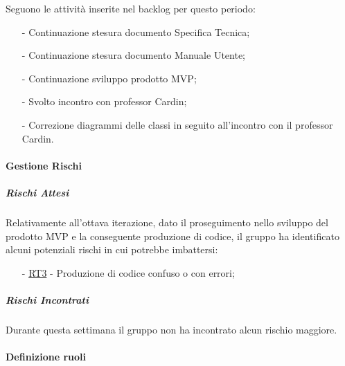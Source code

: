 \documentclass[10pt]{article}
\begin{document}
{{{{{{{{{        Seguono le attività inserite nel backlog per questo periodo:
        \vspace{-0.5em}
        \begin{itemize}
        \setlength\itemsep{-0.2em}
        \item [-] Continuazione stesura documento Specifica Tecnica;
        \item [-] Continuazione stesura documento Manuale Utente;
        \item [-] Continuazione sviluppo prodotto MVP;
        \item [-] Svolto incontro con professor Cardin;
        \item [-] Correzione diagrammi delle classi in seguito all'incontro con il professor Cardin.
        \end{itemize}

        \paragraph{Gestione Rischi}\mbox{}
        \vspace{-1em}
        \subparagraph*{Rischi Attesi}\mbox{}
        
        Relativamente all'ottava iterazione, dato il proseguimento nello sviluppo del prodotto MVP e la conseguente produzione di codice, il gruppo ha identificato alcuni potenziali rischi in cui potrebbe imbattersi:
        \vspace{-0.5em}
        \begin{itemize}
        \setlength\itemsep{-0.2em}
        \item [-] \hyperref[RT3]{RT3} - Produzione di codice confuso o con errori;
        \end{itemize}

        \subparagraph*{Rischi Incontrati}\mbox{}
        
        Durante questa settimana il gruppo non ha incontrato alcun rischio maggiore.

        \paragraph{Definizione ruoli}\mbox{}\vspace{0.4em}
        
}}}}}}}}}
\end{document}
